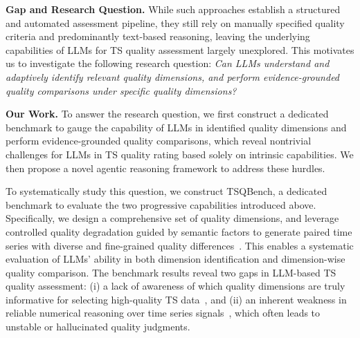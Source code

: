 \documentclass{article}
\newcommand{\partitle}[1]{\smallskip \noindent \textbf{#1.}}
\begin{document}
\partitle{Gap and Research Question} While such approaches establish a structured and automated assessment pipeline, they still rely on manually specified quality criteria and predominantly text-based reasoning, leaving the underlying capabilities of LLMs for TS quality assessment largely unexplored. This motivates us to investigate the following research question: \textit{Can LLMs understand and adaptively identify relevant quality dimensions, and perform evidence-grounded quality comparisons under specific quality dimensions?}

\partitle{Our Work} To answer the research question, we first construct a dedicated benchmark to gauge the capability of LLMs in identified quality dimensions and perform evidence-grounded quality comparisons, which reveal nontrivial challenges for LLMs in TS quality rating based solely on intrinsic capabilities. We then propose a novel agentic reasoning framework to address these hurdles.

To systematically study this question, we construct TSQBench, a dedicated benchmark to evaluate the two progressive capabilities introduced above. Specifically, we design a comprehensive set of quality dimensions, and leverage controlled quality degradation guided by semantic factors to generate paired time series with diverse and fine-grained quality differences~\citep{xie2025chatts}. This enables a systematic evaluation of LLMs' ability in both dimension identification and dimension-wise quality comparison. The benchmark results reveal two gaps in LLM-based TS quality assessment: (i) a lack of awareness of which quality dimensions are truly informative for selecting high-quality TS data~\citep{zhang2026many}, and (ii) an inherent weakness in reliable numerical reasoning over time series signals~\citep{wu2026timeart}, which often leads to unstable or hallucinated quality judgments.
\end{document}
